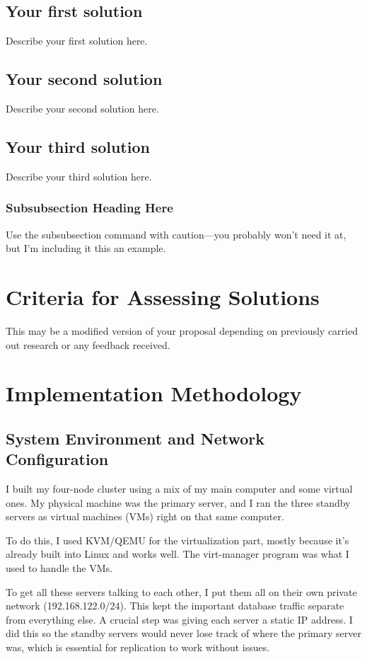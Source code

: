 \documentclass[conference]{IEEEtran}
\begin{document}
\subsection{Your first solution}
Describe your first solution here.
\subsection{Your second solution}
Describe your second solution here.
\subsection{Your third solution}
Describe your third solution here.
\subsubsection{Subsubsection Heading Here}
Use the subsubsection command with caution---you probably won't need it at, but I'm including it this an example.

\section{Criteria for Assessing Solutions} \label{sec:criteria}
This may be a modified version of your proposal depending on previously carried out research or any feedback received.  



\section{Implementation Methodology}

\subsection{System Environment and Network Configuration}
I built my four-node cluster using a mix of my main computer and some virtual ones. My physical machine was the primary server, and I ran the three standby servers as virtual machines (VMs) right on that same computer.

To do this, I used KVM/QEMU for the virtualization part, mostly because it’s already built into Linux and works well. The virt-manager program was what I used to handle the VMs.

To get all these servers talking to each other, I put them all on their own private network (192.168.122.0/24). This kept the important database traffic separate from everything else. A crucial step was giving each server a static IP address. I did this so the standby servers would never lose track of where the primary server was, which is essential for replication to work without issues.
\end{document}
